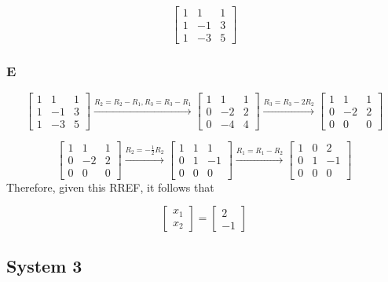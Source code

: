 \documentclass{article}
\begin{document}
\[
	\begin{bmatrix}
		1 & 1  & 1 \\
		1 & -1 & 3 \\
		1 & -3 & 5
	\end{bmatrix}
\]

\subsubsection*{E}

\[
	\begin{bmatrix}
		1 & 1  & 1 \\
		1 & -1 & 3 \\
		1 & -3 & 5
	\end{bmatrix}
	\xrightarrow{R_2 = R_2 - R_1, R_3 = R_3 - R_1}
	\begin{bmatrix}
		1 & 1  & 1 \\
		0 & -2 & 2 \\
		0 & -4 & 4
	\end{bmatrix}
	\xrightarrow{R_3 = R_3 - 2R_2}
	\begin{bmatrix}
		1 & 1  & 1 \\
		0 & -2 & 2 \\
		0 & 0  & 0
	\end{bmatrix}
\]

\[
	\begin{bmatrix}
		1 & 1  & 1 \\
		0 & -2 & 2 \\
		0 & 0  & 0
	\end{bmatrix}
	\xrightarrow{R_2 = -\frac{1}{2}R_2}
	\begin{bmatrix}
		1 & 1 & 1  \\
		0 & 1 & -1 \\
		0 & 0 & 0
	\end{bmatrix}
	\xrightarrow{R_1 = R_1 - R_2}
	\begin{bmatrix}
		1 & 0 & 2  \\
		0 & 1 & -1 \\
		0 & 0 & 0
	\end{bmatrix}
\]
Therefore, given this RREF, it follows that

\[
	\begin{bmatrix}
		x_1 \\
		x_2
	\end{bmatrix}
	=
	\begin{bmatrix}
		2 \\
		-1
	\end{bmatrix}
\]

\subsection*{System 3}
\end{document}
